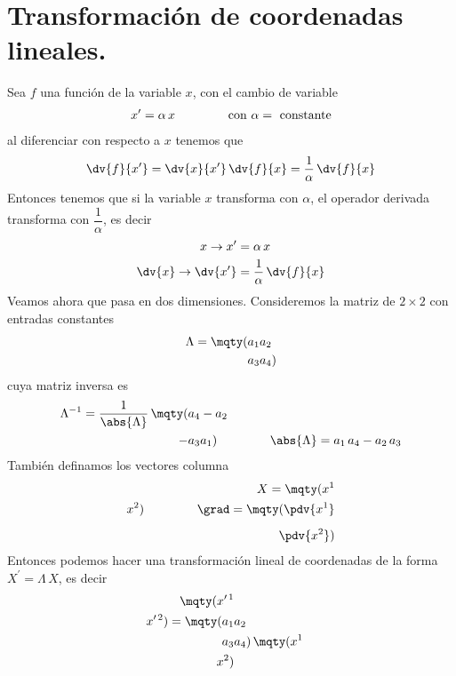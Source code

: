 \section{Transformación de coordenadas lineales.}
Sea $f$ una función de la variable $x$, con el cambio de variable
\begin{align}
x^{\prime} = \alpha \, x \hspace{1.5cm} \mbox{con } \alpha = \mbox{ constante}
\label{eq:ecuacion_10_001}
\end{align}
al diferenciar con respecto a $x$ tenemos que
\begin{align}
\dv{f}{x^{\prime}} = \dv{x}{x^{\prime}} \, \dv{f}{x} = \dfrac{1}{\alpha} \, \dv{f}{x}
\label{eq:ecuacion_10_002}   
\end{align}
Entonces tenemos que si la variable $x$ transforma con $\alpha$, el operador derivada transforma con $\dfrac{1}{\alpha}$, es decir
\begin{align}
\begin{aligned}
x \rightarrow x^{\prime} &= \alpha \, x \\
\dv{x} \rightarrow \dv{x^{\prime}} &= \dfrac{1}{\alpha} \, \dv{f}{x}
\end{aligned}
\label{eq:ecuacion_10_003}
\end{align}
Veamos ahora que pasa en dos dimensiones. Consideremos la matriz de $2 \times 2$ con entradas constantes
\begin{align}
\Lambda = \mqty(a_{1} & a_{2} \\ a_{3} & a_{4})
\label{eq:ecuacion_10_004}   
\end{align}
cuya matriz inversa es
\begin{align}
\Lambda^{-1} = \dfrac{1}{\abs{\Lambda}} \, \mqty(a_{4} & - a_{2} \\ - a_{3} & a_{1}) \hspace{1.5cm} \abs{\Lambda} = a_{1} \, a_{4} - a_{2} \, a_{3}
\label{eq:ecuacion_10_005}   
\end{align}
También definamos los vectores columna
\begin{align}
X = \mqty(x^{1} \\ x^{2}) \hspace{1.5cm} \grad = \mqty(\displaystyle \pdv{x^{1}} \\[0.5em] \displaystyle \pdv{x^{2}})
\label{eq:ecuacion_10_006}   
\end{align}
Entonces podemos hacer una transformación lineal de coordenadas de la forma $X^{\prime} = \Lambda \, X$, es decir
\begin{align}
\mqty(x^{\prime \, 1} \\ x^{\prime \, 2}) =
\mqty(a_{1} & a_{2} \\ a_{3} & a_{4}) \, \mqty(x^{1} \\ x^{2})
\label{eq:ecuacion_10_007}   
\end{align}
